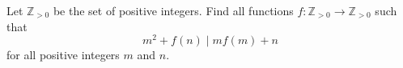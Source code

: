 Let $\mathbb{Z}_{>0}$ be the set of positive integers. Find all functions $f\colon \mathbb{Z}_{>0}\to\mathbb{Z}_{>0}$ such that
\[ m^2 + f(n) \mid mf(m) + n \]
for all positive integers $m$ and $n$.

